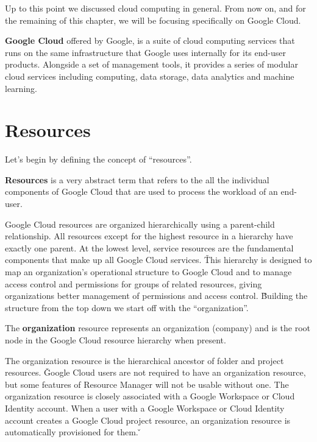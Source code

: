 
Up to this point we discussed cloud computing in general. From now on, and for the remaining of this chapter, we will
be focusing specifically on Google Cloud.

\textbf{Google Cloud} offered by Google, is a suite of cloud computing services that runs on the same infrastructure 
that Google uses internally for its end-user products. Alongside a set of management tools, it provides a series of 
modular cloud services including computing, data storage, data analytics and machine learning.
\ed

\section{Resources}

Let's begin by defining the concept of ``resources''.

\bd[Resources]
\textbf{Resources} is a very abstract term that refers to the all the individual components of Google Cloud that are
used to process the workload of an end-user.
\ed

Google Cloud resources are organized hierarchically using a parent-child relationship. All resources except for the
highest resource in a hierarchy have exactly one parent. At the lowest level, service resources are the fundamental
components that make up all Google Cloud services. \v

This hierarchy is designed to map an organization's operational structure to Google Cloud and to manage access 
control and permissions for groups of related resources, giving organizations better management of permissions and 
access control. \v

Building the structure from the top down we start off with the ``organization''.

\bd[Organization]
The \textbf{organization} resource represents an organization (company) and is the root node in the Google Cloud
resource hierarchy when present.
\ed

The organization resource is the hierarchical ancestor of folder and project resources. \v

Google Cloud users are not required to have an organization resource, but some features of Resource Manager will not
be usable without one. The organization resource is closely associated with a Google Workspace or Cloud Identity
account. When a user with a Google Workspace or Cloud Identity account creates a Google Cloud project resource, an
organization resource is automatically provisioned for them. \v


